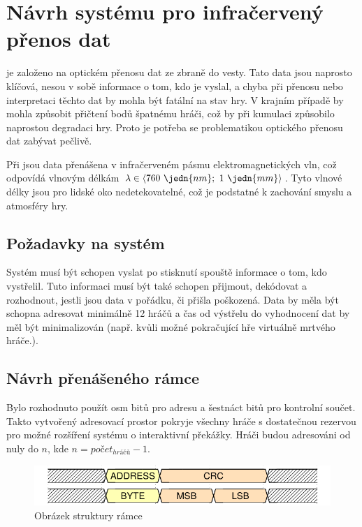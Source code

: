 \chapter{Návrh systému pro infračervený přenos dat}
 je založeno na optickém přenosu dat ze zbraně do vesty. Tato data jsou naprosto klíčová, nesou v sobě informace o tom, kdo je vyslal, a chyba při přenosu nebo interpretaci těchto dat by mohla být fatální na stav hry. V krajním případě by mohla způsobit přičtení bodů špatnému hráči, což by při kumulaci způsobilo naprostou degradaci hry. Proto je potřeba se problematikou optického přenosu dat zabývat pečlivě.

Při  jsou data přenášena v infračerveném pásmu elektromagnetických vln, což odpovídá vlnovým délkám $\lambda \in \langle 760~\jedn{nm};~1~\jedn{mm}\rangle$. Tyto vlnové délky jsou pro lidské oko nedetekovatelné, což je podstatné k zachování smyslu a atmosféry hry.

\section{Požadavky na systém}
Systém musí být schopen vyslat po stisknutí spouště informace o tom, kdo vystřelil. Tuto informaci musí být také schopen přijmout, dekódovat a rozhodnout, jestli jsou data v pořádku, či přišla poškozená. Data by měla být schopna adresovat minimálně 12 hráčů a čas od výstřelu do vyhodnocení dat by měl být minimalizován (např. kvůli možné pokračující hře virtuálně mrtvého hráče.).

\section{Návrh přenášeného rámce}
Bylo rozhodnuto použít osm bitů pro adresu a šestnáct bitů pro kontrolní součet. Takto vytvořený adresovací prostor pokryje všechny hráče s dostatečnou rezervou pro možné rozšíření systému o interaktivní překážky. Hráči budou adresováni od nuly do $n$, kde $n = počet _{hráčů} - 1$.

\begin{figure}[H]
    \begin{center}
        \includegraphics[width=\textwidth]{img/ir-packet}
    \end{center}
    \caption{Obrázek struktury rámce}
\end{figure}

